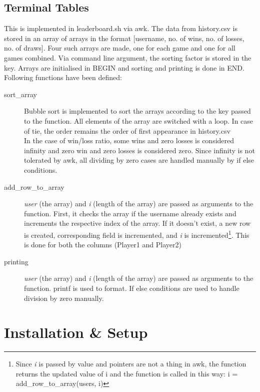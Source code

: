 \documentclass[12pt]{article}
\begin{document}
\subsection{Terminal Tables}
This is implemented in leaderboard.sh via awk. The data from history.csv is stored in an array of arrays in the format [username, no. of wins, no. of losses, no. of draws]. Four such arrays are made, one for each game and one for all games combined. Via command line argument, the sorting factor is stored in the key. Arrays are initialised in BEGIN and sorting and printing is done in END. Following functions have been defined: 
\begin{description}
    \item[sort\_array] Bubble sort is implemented to sort the arrays according to the key passed to the function. All elements of the array are switched with a loop. In case of tie, the order remains the order of first appearance in history.csv \\ 
    In the case of win/loss ratio, some wins and zero losses is considered infinity and zero win and zero losses is considered zero. Since infinity is not tolerated by awk, all dividing by zero cases are handled manually by if else conditions.

    \item[add\_row\_to\_array] \textit{user} (the array) and \textit{i} (length of the array) are passed as arguments to the function. First, it checks the array if the username already exists and increments the respective index of the array. If it doesn't exist, a new row is created, corresponding field is incremented, and \textit{i} is incremented\footnote{Since \textit{i} is passed by value and pointers are not a thing in awk, the function returns the updated value of i and the function is called in this way: i = add\_row\_to\_array(users, i)}. This is done for both the columns (Player1 and Player2)

    \item[printing] \textit{user} (the array) and \textit{i} (length of the array) are passed as arguments to the function. printf is used to format. If else conditions are used to handle division by zero manually.
    
    
\end{description}

\section{Installation \& Setup}
\end{document}
